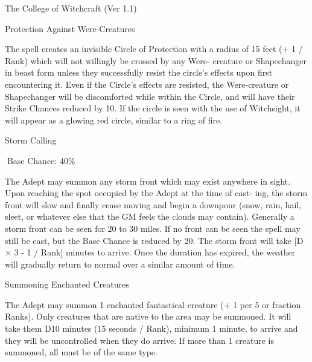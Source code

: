 \begin{Chapter}{The College of Witchcraft (Ver 1.1)}
\begin{spell}[G-9]{Protection Against Were-Creatures}

\begin{effects}
 The  spell  creates  an  invisible  Circle  of 
Protection  with  a  radius  of  15  feet  (+  1  /  Rank) 
which  will  not  willingly  be  crossed  by  any  Were-
creature or Shapechanger in beast form unless they 
successfully  resist  the  circle’s  effects  upon  first 
encountering  it.  Even  if  the  Circle’s  effects  are 
resisted,  the  Were-creature  or  Shapechanger  will 
be  discomforted  while  within  the  Circle,  and  will 
have  their  Strike  Chances  reduced  by  10.  If  the 
circle  is  seen  with  the  use  of  Witchsight,  it  will 
appear as a glowing red circle, similar to a ring of 
fire. 

\end{effects}
\end{spell}

\begin{spell}[G-10]{Storm Calling }


Base Chance: 40\% 
\begin{effects}
 The  Adept  may  summon  any  storm  front 
which may exist anywhere in sight. Upon reaching 
the spot occupied by the Adept at the time of cast-
ing,  the  storm  front  will  slow  and  finally  cease 
moving  and  begin  a  downpour  (snow,  rain,  hail, 
sleet, or whatever else that the GM feels the clouds 
may  contain).  Generally  a  storm front  can be  seen 
for 20 to 30 miles. If no front can be seen the spell 
may  still  be  cast,  but  the  Base  Chance  is  reduced 
by 20. The storm front will take [D × 3 - 1 / Rank] 
minutes  to  arrive.  Once  the  duration  has  expired, 
the  weather  will  gradually  return to  normal  over  a 
similar amount of time. 

\end{effects}
\end{spell}

\begin{spell}[G-11]{Summoning Enchanted Creatures }

\begin{effects}
 The  Adept  may  summon  1  enchanted 
fantastical  creature  (+  1  per  5  or  fraction  Ranks). 
Only  creatures  that  are  native  to  the  area  may  be 
summoned.  It  will  take  them  D10  minutes  (15 
seconds / Rank), minimum 1 minute, to arrive and 
they  will  be  uncontrolled  when  they  do  arrive.  If 
more  than  1  creature  is  summoned,  all  must  be  of 
the same type. 


\end{effects}
\end{spell}
\end{Chapter}
